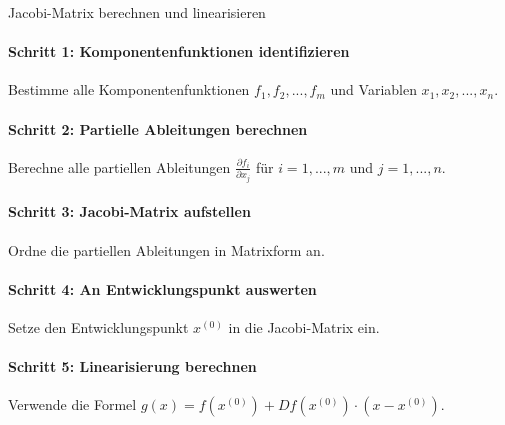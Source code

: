 \begin{KR}{Jacobi-Matrix berechnen und linearisieren}
\paragraph{Schritt 1: Komponentenfunktionen identifizieren}
Bestimme alle Komponentenfunktionen $f_1, f_2, ..., f_m$ und Variablen $x_1, x_2, ..., x_n$.

\paragraph{Schritt 2: Partielle Ableitungen berechnen}
Berechne alle partiellen Ableitungen $\frac{\partial f_i}{\partial x_j}$ für $i = 1, ..., m$ und $j = 1, ..., n$.

\paragraph{Schritt 3: Jacobi-Matrix aufstellen}
Ordne die partiellen Ableitungen in Matrixform an.

\paragraph{Schritt 4: An Entwicklungspunkt auswerten}
Setze den Entwicklungspunkt $x^{(0)}$ in die Jacobi-Matrix ein.

\paragraph{Schritt 5: Linearisierung berechnen}
Verwende die Formel $g(x) = f(x^{(0)}) + Df(x^{(0)}) \cdot (x - x^{(0)})$.
\end{KR}

